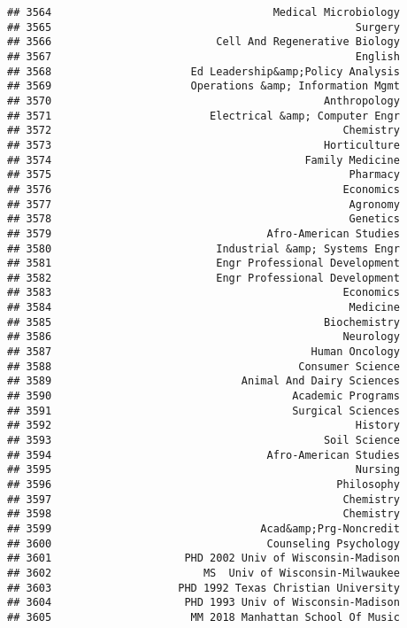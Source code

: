\documentclass[
]{article}
\begin{document}
\begin{verbatim}
## 3564                                   Medical Microbiology
## 3565                                                Surgery
## 3566                          Cell And Regenerative Biology
## 3567                                                English
## 3568                      Ed Leadership&amp;Policy Analysis
## 3569                      Operations &amp; Information Mgmt
## 3570                                           Anthropology
## 3571                         Electrical &amp; Computer Engr
## 3572                                              Chemistry
## 3573                                           Horticulture
## 3574                                        Family Medicine
## 3575                                               Pharmacy
## 3576                                              Economics
## 3577                                               Agronomy
## 3578                                               Genetics
## 3579                                  Afro-American Studies
## 3580                          Industrial &amp; Systems Engr
## 3581                          Engr Professional Development
## 3582                          Engr Professional Development
## 3583                                              Economics
## 3584                                               Medicine
## 3585                                           Biochemistry
## 3586                                              Neurology
## 3587                                         Human Oncology
## 3588                                       Consumer Science
## 3589                              Animal And Dairy Sciences
## 3590                                      Academic Programs
## 3591                                      Surgical Sciences
## 3592                                                History
## 3593                                           Soil Science
## 3594                                  Afro-American Studies
## 3595                                                Nursing
## 3596                                             Philosophy
## 3597                                              Chemistry
## 3598                                              Chemistry
## 3599                                 Acad&amp;Prg-Noncredit
## 3600                                  Counseling Psychology
## 3601                     PHD 2002 Univ of Wisconsin-Madison
## 3602                        MS  Univ of Wisconsin-Milwaukee
## 3603                    PHD 1992 Texas Christian University
## 3604                     PHD 1993 Univ of Wisconsin-Madison
## 3605                      MM 2018 Manhattan School Of Music

\end{verbatim}
\end{document}
